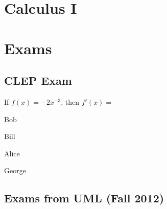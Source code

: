 \documentclass[crop=false,class=article,oneside]{standalone}
\begin{document}
    \ifx\ifmathcoursescalculusI\undefined
        \section*{Calculus I}
        \setcounter{section}{1}
    \else
        \section{Exams}
    \fi
    \subsection{CLEP Exam}
        \begin{problem}
            If $f(x)=-2x^{-3}$, then $f'(x)=$
            \begin{enumerate}[label=(\Alph*)]
                \begin{multicols}{4}
                    \item Bob
                    \item Bill
                    \item Alice
                    \item George
                \end{multicols}
            \end{enumerate}
        \end{problem}
    \subsection{Exams from UML (Fall 2012)}
\end{document}
